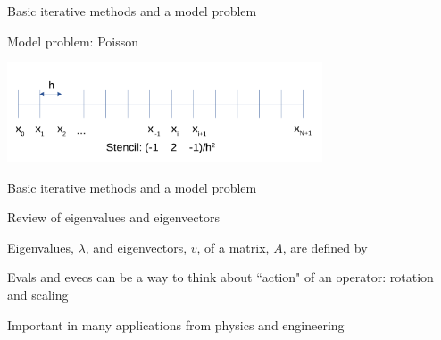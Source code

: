 \documentclass[18pt,xcolor=table]{beamer}
\begin{document}
\begin{frame}{Basic iterative methods and a model problem}
\begin{block}{Model problem: Poisson}
\begin{center}
\includegraphics[width=0.7\textwidth]{../figures/1DFDPoisson}
\end{center}
\end{block}
\end{frame}



\begin{frame}{Basic iterative methods and a model problem}
\begin{block}{Review of eigenvalues and eigenvectors}
\bit
\item Eigenvalues, $\lambda$, and eigenvectors, $v$, of a matrix, $A$, are defined by
\item Evals and evecs can be a way to think about ``action" of an operator: rotation and scaling
\item Important in many applications from physics and engineering
\eit
\end{block}
\end{frame}
\end{document}
